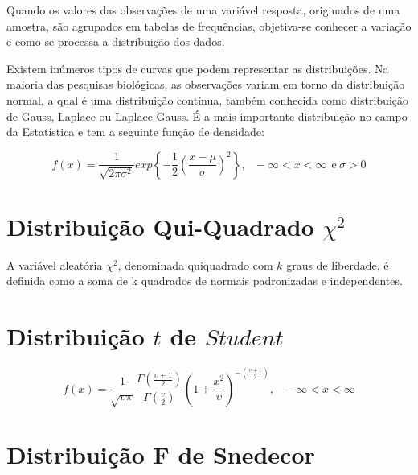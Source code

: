 \inic Quando os valores das observações de uma variável resposta, originados de uma amostra, são agrupados em tabelas de frequências, objetiva-se conhecer a variação e como se processa a distribuição dos dados.\vskip0.3cm 

\inic Existem inúmeros tipos de curvas que podem representar as distribuições. Na maioria das pesquisas biológicas, as observações variam em torno da distribuição normal, a qual é uma distribuição contínua, também conhecida como distribuição de Gauss, Laplace ou Laplace-Gauss. É a mais importante distribuição no campo da Estatística e tem a seguinte função de densidade:


\begin{equation}
f\left(x\right) = \frac{1}{\sqrt{2\pi \sigma^2}}exp \left\{-\frac{1}{2}\left(\frac{x-\mu}{\sigma}\right)^2 \right\},~~~-\infty<x<\infty~~\text{e}~\sigma>0 
 \end{equation}


\section{Distribuição Qui-Quadrado $\chi^{2}$}

\inic A variável aleatória $\chi^{2}$, denominada quiquadrado com $k$ graus de liberdade, é definida como a soma de k quadrados de normais padronizadas e independentes. 



\section{Distribuição $t$ de $Student$}

\begin{equation}
f\left(x\right)=\frac{1}{\sqrt{\upsilon \pi}}\frac{\Gamma\left(\frac{\upsilon+1}{2}\right) }{\Gamma \left(\frac{\upsilon}{2}\right)}\left(1+\frac{x^2}{\upsilon}\right)^{-\left(\frac{\upsilon+1}{2}\right)},~~~-\infty<x<\infty
\end{equation}


\section{Distribuição F de Snedecor}




 